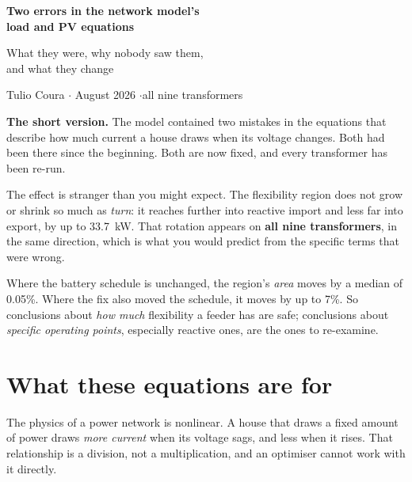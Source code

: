 \documentclass[11pt,a4paper]{article}
\begin{document}
\begin{center}
{\LARGE\bfseries Two errors in the network model's\\[2pt] load and PV equations\par}
\vspace{0.7em}
{\large\color{ink2} What they were, why nobody saw them,\\ and what they change\par}
\vspace{0.9em}
{\color{ink2}\small Tulio Coura \quad$\cdot$ August 2026 \quad$\cdot$\quad all nine transformers\par}
\end{center}

\vspace{0.6em}

\begin{tcolorbox}[colback=panel,colframe=rule,boxrule=0.7pt,arc=2pt,
                  left=10pt,right=10pt,top=9pt,bottom=9pt]
\textbf{The short version.} The model contained two mistakes in the equations that
describe how much current a house draws when its voltage changes. Both had been there
since the beginning. Both are now fixed, and every transformer has been re-run.

\medskip
The effect is stranger than you might expect. The flexibility region does not grow or
shrink so much as \emph{turn}: it reaches further into reactive import and less far into
export, by up to 33.7~kW. That rotation appears on \textbf{all nine transformers}, in the
same direction, which is what you would predict from the specific terms that were wrong.

\medskip
Where the battery schedule is unchanged, the region's \emph{area} moves by a median of
0.05\%. Where the fix also moved the schedule, it moves by up to 7\%. So conclusions about
\emph{how much} flexibility a feeder has are safe; conclusions about \emph{specific
operating points}, especially reactive ones, are the ones to re-examine.
\end{tcolorbox}

\section{What these equations are for}

The physics of a power network is nonlinear. A house that draws a fixed amount of power
draws \emph{more current} when its voltage sags, and less when it rises. That
relationship is a division, not a multiplication, and an optimiser cannot work with it
directly.
\end{document}
